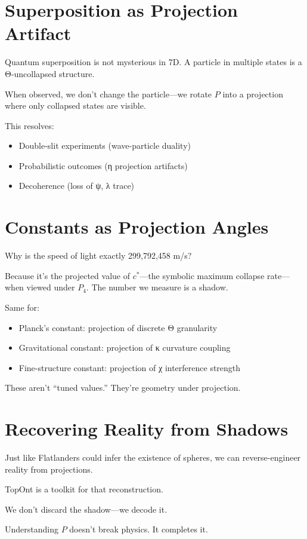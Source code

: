 \section{Superposition as Projection Artifact}

Quantum superposition is not mysterious in 7D. A particle in multiple states is a Θ-uncollapsed structure.

When observed, we don’t change the particle—we rotate $P$ into a projection where only collapsed states are visible.

This resolves:
\begin{itemize}
\item Double-slit experiments (wave-particle duality)
\item Probabilistic outcomes (η projection artifacts)
\item Decoherence (loss of ψ, λ trace)
\end{itemize}

\section{Constants as Projection Angles}

Why is the speed of light exactly 299,792,458 m/s?

Because it’s the projected value of $c^*$—the symbolic maximum collapse rate—when viewed under $P_4$. The number we measure is a shadow.

Same for:
\begin{itemize}
\item Planck’s constant: projection of discrete Θ granularity
\item Gravitational constant: projection of κ curvature coupling
\item Fine-structure constant: projection of χ interference strength
\end{itemize}

These aren’t “tuned values.” They’re geometry under projection.

\section{Recovering Reality from Shadows}

Just like Flatlanders could infer the existence of spheres, we can reverse-engineer reality from projections.

TopOnt is a toolkit for that reconstruction.

We don't discard the shadow—we decode it.

\bigskip

Understanding $P$ doesn’t break physics. It completes it.
